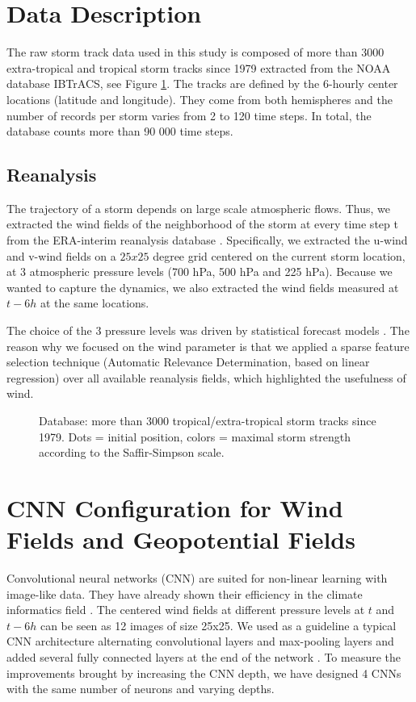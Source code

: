 \section{Data Description}
The raw storm track data used in this study is composed of more than 3000 extra-tropical and tropical storm tracks since 1979 extracted from the NOAA database IBTrACS\cite{knapp2010international}, see Figure \ref{fig:storm_tracks}. The tracks are defined by the 6-hourly center locations (latitude and longitude). They come from both hemispheres and the number of records per storm varies from 2 to 120 time steps. In total, the database counts more than 90 000 time steps. 

\subsection{Reanalysis}


The trajectory of a storm depends on large scale atmospheric flows. Thus, we extracted the wind fields of the neighborhood of the storm at every time step t from the ERA-interim reanalysis database \cite{dee2011era}. Specifically, we extracted the u-wind and v-wind fields on a $25x25$ degree grid centered on the current storm location, at 3 atmospheric pressure levels (700 hPa, 500 hPa and 225 hPa). Because we wanted to capture the dynamics, we also extracted the wind fields measured at $t - 6h$ at the same locations.

The choice of the 3 pressure levels was driven by statistical forecast models \cite{demaria2005further}. The reason why we focused on the wind parameter is that we applied a sparse feature selection technique (Automatic Relevance Determination, based on linear regression) over all available reanalysis fields, which highlighted the usefulness of wind.

\begin{figure}
	\begin{center}
		\hsize {}
	\end{center}
	\caption{Database: more than 3000 tropical/extra-tropical storm
 	tracks since 1979. Dots = initial position, colors = maximal storm strength according to the Saffir-Simpson scale.}
	\label{fig:storm_tracks}
\end{figure}


\section{CNN Configuration for Wind Fields and Geopotential Fields}
Convolutional neural networks (CNN) are suited for non-linear learning with image-like data. They have already shown their efficiency in the climate informatics field \cite{xingjian2015convolutional, de2017deep,racah2017extremeweather}. The centered wind fields at different pressure levels at $t$ and $t-6h$ can be seen as 12 images of size 25x25. We used as a guideline a typical CNN architecture alternating convolutional layers and max-pooling layers and added several fully connected layers at the end of the network \cite{simonyan2014very}. To measure the improvements brought by increasing the CNN depth, we have designed 4 CNNs with the same number of neurons and varying depths. 


